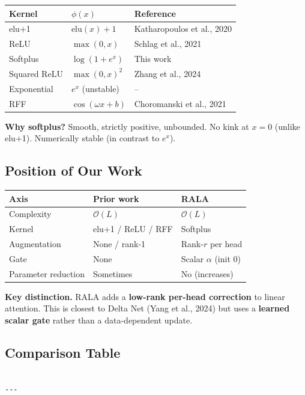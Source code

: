 \begin{table}[H]
\centering
\small
\begin{tabular}{lll}
\toprule
\textbf{Kernel} & \textbf{$\phi(x)$} & \textbf{Reference} \\
\midrule
elu+1 & $\mathrm{elu}(x) + 1$ & Katharopoulos et al., 2020 \\
ReLU & $\max(0, x)$ & Schlag et al., 2021 \\
Softplus & $\log(1 + e^x)$ & This work \\
Squared ReLU & $\max(0, x)^2$ & Zhang et al., 2024 \\
Exponential & $e^x$ (unstable) & -- \\
RFF & $\cos(\omega x + b)$ & Choromanski et al., 2021 \\
\bottomrule
\end{tabular}
\end{table}

\textbf{Why softplus?} Smooth, strictly positive, unbounded. No kink at $x = 0$ 
(unlike elu+1). Numerically stable (in contrast to $e^x$).

\subsection{Position of Our Work}

\begin{table}[H]
\centering
\small
\begin{tabular}{lll}
\toprule
\textbf{Axis} & \textbf{Prior work} & \textbf{RALA} \\
\midrule
Complexity & $\mathcal{O}(L)$ & $\mathcal{O}(L)$ \\
Kernel & elu+1 / ReLU / RFF & Softplus \\
Augmentation & None / rank-1 & Rank-$r$ per head \\
Gate & None & Scalar $\alpha$ (init 0) \\
Parameter reduction & Sometimes & No (increases) \\
\bottomrule
\end{tabular}
\end{table}

\textbf{Key distinction.} RALA adds a \textbf{low-rank per-head correction} to linear 
attention. This is closest to Delta Net (Yang et al., 2024) but uses a 
\textbf{learned scalar gate} rather than a data-dependent update.



\subsection{Comparison Table}

\begin{lstlisting}

---
\end{lstlisting}